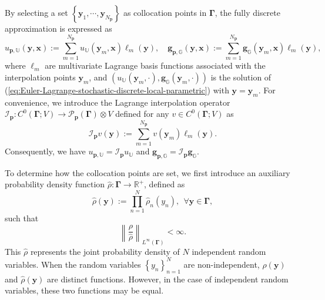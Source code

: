 \documentclass[final,onefignum,onetabnum]{mousaviart}
\begin{document}
	By selecting a set $\left\lbrace \boldsymbol{y}_1 , \cdots, \boldsymbol{y}_{N_{\boldsymbol{p}}}\right\rbrace $ as collocation points in $\boldsymbol{\Gamma}$, the fully discrete approximation is expressed as
	\begin{equation}
		\label{def:discrete-solution}
		u_{ \boldsymbol{p} , \mathbb{U}}(\boldsymbol{y}, \boldsymbol{x}) := 
		\sum_{m=1}^{N_{\boldsymbol{p}}} u_{\mathbb{U}}(\boldsymbol{y}_m, \boldsymbol{x})
		\ell_m(\boldsymbol{y}), 
		\quad
		\boldsymbol{g}_{ \boldsymbol{p} , \mathbb{G}}(\boldsymbol{y}, \boldsymbol{x}) := 
		\sum_{m=1}^{N_{\boldsymbol{p}}} \boldsymbol{g}_{\mathbb{G}}(\boldsymbol{y}_m, \boldsymbol{x})
		\ell_m(\boldsymbol{y}),
	\end{equation}
	where $\ell_m$ are multivariate Lagrange basis functions associated with the interpolation points $\boldsymbol{y}_m$, and $\left( u_{\mathbb{U}}(\boldsymbol{y}_m, \cdot), \boldsymbol{g}_{\mathbb{G}}(\boldsymbol{y}_m, \cdot) \right) $ is the solution of (\ref{eq:Euler-Lagrange-stochastic-discrete-local-parametric}) with $\boldsymbol{y} = \boldsymbol{y}_m$. 
	For convenience, we introduce the Lagrange interpolation operator $\mathcal{I}_{\boldsymbol{p}}: C^0(\boldsymbol{\Gamma}; V) \rightarrow \mathcal{P}_{\boldsymbol{p}}(\boldsymbol{\Gamma}) \otimes V$ defined for any $v \in C^0(\boldsymbol{\Gamma}; V)$ as
	\begin{equation}
		\label{def:interpolation-op}
		\mathcal{I}_{\boldsymbol{p}} v(\boldsymbol{y}) := \sum_{m=1}^{N_{\boldsymbol{p}}}{v(\boldsymbol{y}_m) \ell_m(\boldsymbol{y})}.
	\end{equation}
	Consequently, we have $u_{\boldsymbol{p}, \mathbb{U}} = \mathcal{I}_{\boldsymbol{p}}{u_\mathbb{U}}$ and $ \boldsymbol{g}_{\boldsymbol{p} , \mathbb{G}} = \mathcal{I}_{\boldsymbol{p}} \boldsymbol{g_\mathbb{G}}$.
	
	To determine how the collocation points are set, we first introduce an auxiliary probability density function $\hat{\rho}:\boldsymbol{\Gamma} \rightarrow \mathbb{R}^{+}$, defined as
	\begin{equation*}
		\label{def:join-rho-idep}
		\hat{\rho}(\boldsymbol{y}):= \prod_{n=1}^N \hat{\rho}_n(y_n), ~~ \forall \boldsymbol{y} \in \boldsymbol{\Gamma}, 
	\end{equation*}
	such that
	\begin{equation}
		\label{def:join-rho}
		\left\|  \dfrac{\rho}{\hat{\rho}} 
		\right\| _{L^{\infty}(\boldsymbol{\Gamma})} < \infty.
	\end{equation} 
	This $\hat{\rho}$ represents the joint probability density of $N$ independent random variables. When the random variables $\left\lbrace y_n\right\rbrace _{n=1}^N$ are non-independent, $\rho(\boldsymbol{y})$ and $\hat{\rho}(\boldsymbol{y})$ are distinct functions. However, in the case of independent random variables, these two functions may be equal.
	
\end{document}
